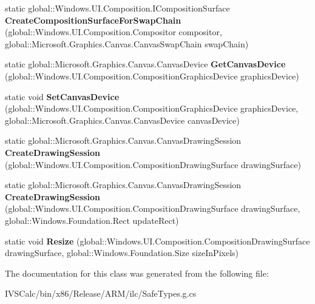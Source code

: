 \begin{DoxyCompactItemize}
static global\+::\+Windows.\+U\+I.\+Composition.\+I\+Composition\+Surface {\bfseries Create\+Composition\+Surface\+For\+Swap\+Chain} (global\+::\+Windows.\+U\+I.\+Composition.\+Compositor compositor, global\+::\+Microsoft.\+Graphics.\+Canvas.\+Canvas\+Swap\+Chain swap\+Chain)
\item 
\mbox{\label{class_microsoft_1_1_graphics_1_1_canvas_1_1_u_i_1_1_composition_1_1_canvas_composition_a3b6e31d08196ba66744cad30ed1a1e1c}} 
static global\+::\+Microsoft.\+Graphics.\+Canvas.\+Canvas\+Device {\bfseries Get\+Canvas\+Device} (global\+::\+Windows.\+U\+I.\+Composition.\+Composition\+Graphics\+Device graphics\+Device)
\item 
\mbox{\label{class_microsoft_1_1_graphics_1_1_canvas_1_1_u_i_1_1_composition_1_1_canvas_composition_a80598aedf841c5ed7457b3b96fd2b114}} 
static void {\bfseries Set\+Canvas\+Device} (global\+::\+Windows.\+U\+I.\+Composition.\+Composition\+Graphics\+Device graphics\+Device, global\+::\+Microsoft.\+Graphics.\+Canvas.\+Canvas\+Device canvas\+Device)
\item 
\mbox{\label{class_microsoft_1_1_graphics_1_1_canvas_1_1_u_i_1_1_composition_1_1_canvas_composition_a1f8acd780668173cb52fdc3fcbcdc428}} 
static global\+::\+Microsoft.\+Graphics.\+Canvas.\+Canvas\+Drawing\+Session {\bfseries Create\+Drawing\+Session} (global\+::\+Windows.\+U\+I.\+Composition.\+Composition\+Drawing\+Surface drawing\+Surface)
\item 
\mbox{\label{class_microsoft_1_1_graphics_1_1_canvas_1_1_u_i_1_1_composition_1_1_canvas_composition_a55e464bf5949c3a7f758e8313be5e37a}} 
static global\+::\+Microsoft.\+Graphics.\+Canvas.\+Canvas\+Drawing\+Session {\bfseries Create\+Drawing\+Session} (global\+::\+Windows.\+U\+I.\+Composition.\+Composition\+Drawing\+Surface drawing\+Surface, global\+::\+Windows.\+Foundation.\+Rect update\+Rect)
\item 
\mbox{\label{class_microsoft_1_1_graphics_1_1_canvas_1_1_u_i_1_1_composition_1_1_canvas_composition_a73077ba32784e9ec043ebe0500e598ea}} 
static void {\bfseries Resize} (global\+::\+Windows.\+U\+I.\+Composition.\+Composition\+Drawing\+Surface drawing\+Surface, global\+::\+Windows.\+Foundation.\+Size size\+In\+Pixels)
\end{DoxyCompactItemize}


The documentation for this class was generated from the following file\+:\begin{DoxyCompactItemize}
\item 
I\+V\+S\+Calc/bin/x86/\+Release/\+A\+R\+M/ilc/Safe\+Types.\+g.\+cs\end{DoxyCompactItemize}
